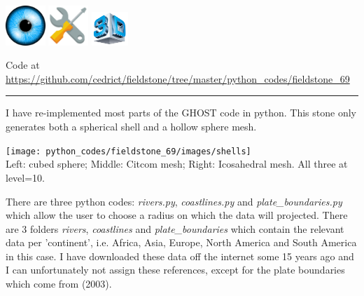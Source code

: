 \includegraphics[height=1.5cm]{images/pictograms/visualisation}
\includegraphics[height=1.5cm]{images/pictograms/tools}
\includegraphics[height=1.25cm]{images/pictograms/3d}


%

\begin{center}
Code at \url{https://github.com/cedrict/fieldstone/tree/master/python_codes/fieldstone_69}
\end{center}

\par\noindent\rule{\textwidth}{0.4pt}

I have re-implemented most parts of the GHOST code \cite{thie18} in python. 
This stone only generates both a spherical shell and a hollow sphere mesh.

\begin{center}
\texttt{[image: python\_codes/fieldstone\_69/images/shells]}\\
{\captionfont Left: cubed sphere; Middle: Citcom mesh; Right: Icosahedral mesh. 
All three at level=10.}
\end{center}

There are three python codes: {\sl rivers.py}, {\sl coastlines.py} and {\sl plate\_boundaries.py} 
which allow the user to choose a radius on which the data will projected. There are 3 folders 
{\sl rivers}, {\sl coastlines} and {\sl plate\_boundaries} which contain the relevant data per 
'continent', i.e. Africa, Asia, Europe, North America and South America in this case. 
I have downloaded these data off the internet some 15 years ago and I can unfortunately not assign 
these references, except for the plate boundaries which come from \textcite{bird03} (2003).

